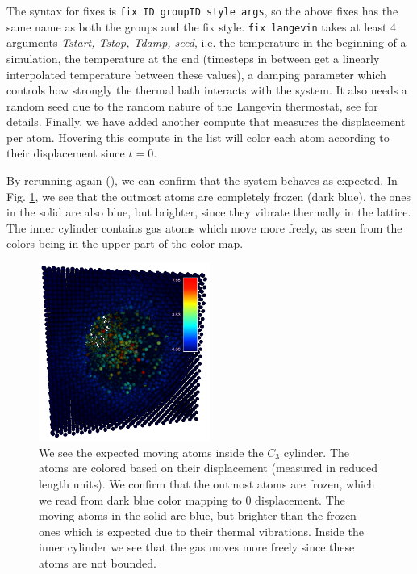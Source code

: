 \documentclass[aps,pre,twocolumn,letterpaper,floatfix,nofootinbib]{revtex4}
\newcommand{\code}[1]{\colorbox{light-gray}{\color{RawSienna}\texttt{#1}}}
\begin{document}
The syntax for fixes is \code{fix ID groupID style args}, so the above fixes has the same name as both the groups and the fix style.
\code{fix langevin} takes at least 4 arguments \textit{Tstart, Tstop, Tdamp, seed}, i.e. the temperature in the beginning of a simulation, the temperature at the end (timesteps in between get a linearly interpolated temperature between these values), a damping parameter which controls how strongly the thermal bath interacts with the system.
It also needs a random seed due to the random nature of the Langevin thermostat, see \citep{schneider1978molecular} for details.
Finally, we have added another compute that measures the displacement per atom.
Hovering this compute in the list will color each atom according to their displacement since $t=0$.

By rerunning again (), we can confirm that the system behaves as expected.
In Fig. \ref{fig:moving_atoms}, we see that the outmost atoms are completely frozen (dark blue), the ones in the solid are also blue, but brighter, since they vibrate thermally in the lattice.
The inner cylinder contains gas atoms which move more freely, as seen from the colors being in the upper part of the color map.

\begin{figure}
	\centering
	\includegraphics[width=0.5\textwidth]{lj_flow/07_moving.png}
	\caption{
		We see the expected moving atoms inside the $C_3$ cylinder.
		The atoms are colored based on their displacement (measured in reduced length units).
		We confirm that the outmost atoms are frozen, which we read from dark blue color mapping to 0 displacement.
		The moving atoms in the solid are blue, but brighter than the frozen ones which is expected due to their thermal vibrations.
		Inside the inner cylinder we see that the gas moves more freely since these atoms are not bounded.
    }
	\label{fig:moving_atoms}
\end{figure}
\end{document}
